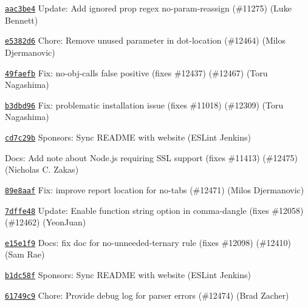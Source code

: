 \begin{DoxyItemize}
\item \href{https://github.com/eslint/eslint/commit/aac3be435cccc241781150fcac728df04d086fa8}{\texttt{ {\ttfamily aac3be4}}} Update\+: Add ignored prop regex no-\/param-\/reassign (\#11275) (Luke Bennett)
\item \href{https://github.com/eslint/eslint/commit/e5382d6e4eb1344f537b6f107535269e9939fcb8}{\texttt{ {\ttfamily e5382d6}}} Chore\+: Remove unused parameter in dot-\/location (\#12464) (Milos Djermanovic)
\item \href{https://github.com/eslint/eslint/commit/49faefbee3fc7daaf2482d9d7d23513d6ffda9e8}{\texttt{ {\ttfamily 49faefb}}} Fix\+: no-\/obj-\/calls false positive (fixes \#12437) (\#12467) (Toru Nagashima)
\item \href{https://github.com/eslint/eslint/commit/b3dbd9657bbeac6571111a4429b03fc085ba6655}{\texttt{ {\ttfamily b3dbd96}}} Fix\+: problematic installation issue (fixes \#11018) (\#12309) (Toru Nagashima)
\item \href{https://github.com/eslint/eslint/commit/cd7c29b17085c14c9cf6345201c72a192c0d0e0c}{\texttt{ {\ttfamily cd7c29b}}} Sponsors\+: Sync R\+E\+A\+D\+ME with website (E\+S\+Lint Jenkins)
\item \href{https://github.com/eslint/eslint/commit/8233873b8e5facd80ab7b172bff1e896a9c5fd39}{\texttt{ {}}} Docs\+: Add note about Node.\+js requiring S\+SL support (fixes \#11413) (\#12475) (Nicholas C. Zakas)
\item \href{https://github.com/eslint/eslint/commit/89e8aafcc622a4763bed6b9d62f148ef95798f38}{\texttt{ {\ttfamily 89e8aaf}}} Fix\+: improve report location for no-\/tabs (\#12471) (Milos Djermanovic)
\item \href{https://github.com/eslint/eslint/commit/7dffe482d646d4e5f94fa87a22f3b5b2e0a4b189}{\texttt{ {\ttfamily 7dffe48}}} Update\+: Enable function string option in comma-\/dangle (fixes \#12058) (\#12462) (Yeon\+Juan)
\item \href{https://github.com/eslint/eslint/commit/e15e1f933f287d274a726e7f0f0a1dd80f0964af}{\texttt{ {\ttfamily e15e1f9}}} Docs\+: fix doc for no-\/unneeded-\/ternary rule (fixes \#12098) (\#12410) (Sam Rae)
\item \href{https://github.com/eslint/eslint/commit/b1dc58f0a717cb3d19300c845ca23a21ceb610d3}{\texttt{ {\ttfamily b1dc58f}}} Sponsors\+: Sync R\+E\+A\+D\+ME with website (E\+S\+Lint Jenkins)
\item \href{https://github.com/eslint/eslint/commit/61749c94bd8a2ebcdfb89e0cd48c4a029a945079}{\texttt{ {\ttfamily 61749c9}}} Chore\+: Provide debug log for parser errors (\#12474) (Brad Zacher)

\end{DoxyItemize}
